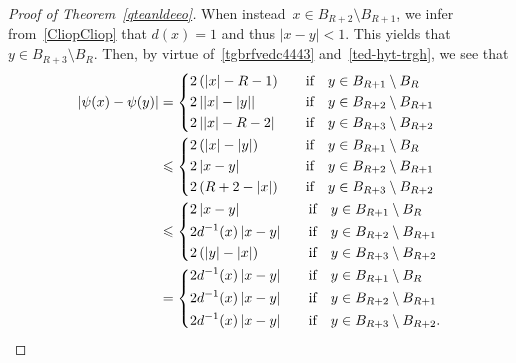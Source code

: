 \documentclass[12pt]{article}
\numberwithin{equation}{section}
\renewcommand{\leq}{\leqslant}
\begin{document}
\begin{proof}[Proof of Theorem~\ref{qteanldeeo}]
When instead~$x\in B_{R+2}\setminus B_{R+1}$, we infer from~\eqref{CliopCliop} that $d(x)=1$ and thus $\left|x-y\right|<1$. This yields that $y\in B_{R+3}\setminus B_R$. Then, by virtue of~\eqref{tgbrfvedc4443}  and~\eqref{ted-hyt-trgh}, we see that
\begin{equation}\label{jjjyyytge}
\begin{split}
\left|\psi(x)-\psi(y)\right|& = \begin{dcases} 
2\left(\left|x\right|-R-1\right)\quad &\mbox{if}\quad y\in B_{R+1}\setminus B_R\\
2\left|\left|x\right|-\left|y\right|\right| \quad &\mbox{if}\quad y\in B_{R+2}\setminus B_{R+1}\\  
2\left|\left|x\right|-R-2\right|\quad &\mbox{if}\quad y\in B_{R+3}\setminus B_{R+2}
\end{dcases}\\
& \leq \begin{dcases} 
2\left(\left|x\right|-\left|y\right|\right)\quad &\mbox{if}\quad y\in B_{R+1}\setminus B_R\\
2\left|x-y\right| \quad &\mbox{if}\quad y\in B_{R+2}\setminus B_{R+1}\\  
2\left(R+2-\left|x\right|\right)\quad &\mbox{if}\quad y\in B_{R+3}\setminus B_{R+2}
\end{dcases}\\
&\leq \begin{dcases} 
2\left|x-y\right|\quad &\mbox{if}\quad y\in B_{R+1}\setminus B_R\\
2d^{-1}(x) \left|x-y\right|\quad &\mbox{if}\quad y\in B_{R+2}\setminus B_{R+1}\\  
2\left(\left|y\right|-\left|x\right|\right)\quad &\mbox{if}\quad y\in B_{R+3}\setminus B_{R+2}
\end{dcases}\\
&=\begin{dcases} 
2d^{-1}(x) \left|x-y\right|\quad &\mbox{if}\quad y\in B_{R+1}\setminus B_R\\
2d^{-1}(x) \left|x-y\right|\quad &\mbox{if}\quad y\in B_{R+2}\setminus B_{R+1}\\  
2d^{-1}(x) \left|x-y\right|\quad &\mbox{if}\quad y\in B_{R+3}\setminus B_{R+2}. 
\end{dcases}
\end{split}
\end{equation}


\end{proof}
\end{document}
